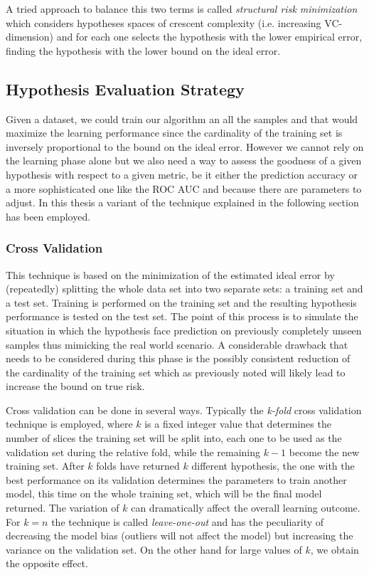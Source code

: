 A tried approach to balance this two terms is called \emph{structural risk
minimization} which considers hypotheses spaces of crescent complexity
(i.e. increasing VC-dimension) and for each one selects the hypothesis with
the lower empirical error, finding the hypothesis with the lower bound on the
ideal error.

\subsection{Hypothesis Evaluation Strategy}
\label{subsec:evaluation}

Given a dataset, we could train our algorithm an all the samples and that would
maximize the learning performance since the cardinality of the training set is
inversely proportional to the bound on the ideal error.
However we cannot rely on the learning phase alone but we also need a way to
assess the goodness of a given hypothesis with respect to a given metric, be it 
either the prediction accuracy or a more sophisticated one like the ROC AUC
and because there are parameters to adjust.
In this thesis a variant of the technique explained in the following section
has been employed.

\subsubsection{Cross Validation}
\label{subsubsec:cv}
This technique is based on the minimization of the estimated ideal error by
(repeatedly) splitting the whole data set into two separate sets: a training set
and a test set.
Training is performed on the training set and the resulting hypothesis performance
is tested on the test set.
The point of this process is to simulate the situation in which the hypothesis
face prediction on previously completely unseen samples thus mimicking the real
world scenario.
A considerable drawback that needs to be considered during this phase is the 
possibly consistent reduction of the cardinality of the training set which as 
previously noted will likely lead to increase the bound on true risk.

Cross validation can be done in several ways. Typically the \emph{k-fold} cross
validation technique is employed, where $k$ is a fixed integer value that
determines the number of slices the training set will be split into, each one to
be used as the validation set during the relative fold, while the remaining $k-1$
become the new training set.
After $k$ folds have returned $k$ different hypothesis, the one with the best
performance on its validation determines the parameters to train another model,
this time on the whole training set, which will be the final model returned.
The variation of $k$ can dramatically affect the overall learning outcome.
For $k=n$ the technique is called \emph{leave-one-out} and has the peculiarity
of decreasing the model bias (outliers will not affect the model) but increasing
the variance on the validation set.
On the other hand for large values of $k$, we obtain the opposite effect.

